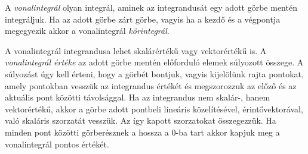 \documentclass[DIV=15,appendixprefix]{scrreprt}
\theoremstyle{definition}
\theoremstyle{remark}
\begin{document}
A \emph{vonalintegrál} olyan integrál, aminek az integrandusát egy adott görbe mentén integráljuk.
Ha az adott görbe zárt görbe, vagyis ha a kezdő és a végpontja megegyezik akkor a vonalintegrál
\emph{körintegrál}.

A vonalintegrál integrandusa lehet skalárértékű vagy vektorértékű is. A \emph{vonalintegrál
értéke} az adott görbe mentén előforduló elemek súlyozott összege. A súlyozást úgy kell érteni, hogy
a görbét  bontjuk, vagyis kijelölünk rajta pontokat, amely pontokban vesszük az
integrandus értékét és megszorozzuk az előző és az aktuális pont közötti távolsággal. Ha az
integrandus nem skalár-, hanem vektorértékű, akkor a görbe adott pontbeli lineáris közelítésével,
érintővektorával, való skaláris szorzatát vesszük. Az így kapott szorzatokat összegezzük. Ha minden
pont közötti görberésznek a hossza a 0-ba tart akkor kapjuk meg a vonalintegrál pontos értékét.
\end{document}
